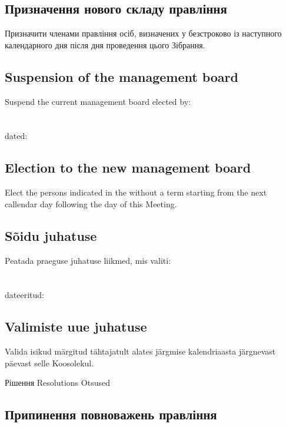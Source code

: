 \begin{Form}
\begin{paracol}{3}
{          \subsection{Призначення нового складу правління}
          Призначити членами правління осіб, визначених у  безстроково із наступного календарного дня після дня проведення цього Зібрання.
        }
        { \subsection{Suspension of the management board}
          Suspend the current management board elected by:\\
          \\
          \\
          dated:\\
          \subsection{Election to the new management board}
          Elect the persons indicated in the  without a term starting from the next callendar day following the day of this Meeting.
        }
        { \subsection{Sõidu juhatuse}
          Peatada praeguse juhatuse liikmed, mis valiti:\\
          \\
          \\
          dateeritud:\\
          \subsection{Valimiste uue juhatuse}
          Valida isikud märgitud  tähtajatult alates järgmise kalendriaasta järgnevast päevast selle Koosolekul.
        }

      \clause
        {Рішення}
        {Resolutions}
        {Otsused}
        { \subsection{Припинення повноважень правління}
}
\end{paracol}
\end{Form}
